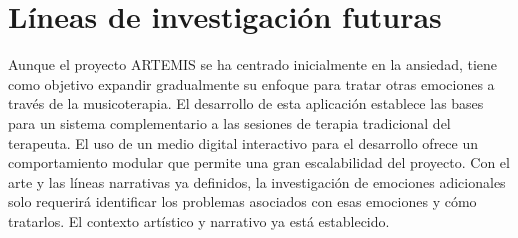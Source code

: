 \section{Líneas de investigación futuras}

Aunque el proyecto ARTEMIS se ha centrado inicialmente en la ansiedad, tiene como objetivo expandir gradualmente su enfoque para tratar otras emociones a través de la musicoterapia. El desarrollo de esta aplicación establece las bases para un sistema complementario a las sesiones de terapia tradicional del terapeuta. El uso de un medio digital interactivo para el desarrollo ofrece un comportamiento modular que permite una gran escalabilidad del proyecto. Con el arte y las líneas narrativas ya definidos, la investigación de emociones adicionales solo requerirá identificar los problemas asociados con esas emociones y cómo tratarlos. El contexto artístico y narrativo ya está establecido.